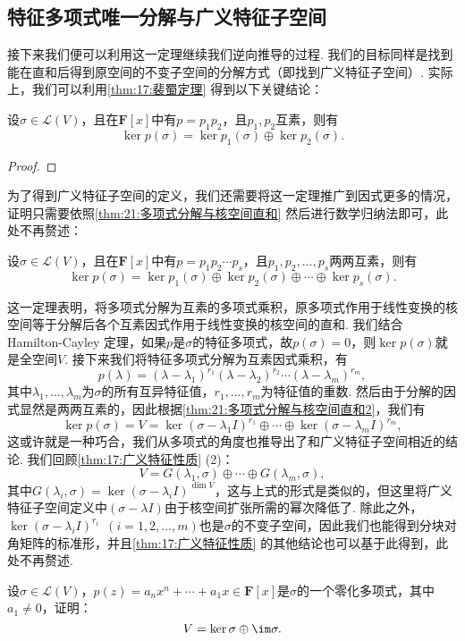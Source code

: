 \subsection{特征多项式唯一分解与广义特征子空间}
接下来我们便可以利用这一定理继续我们逆向推导的过程. 我们的目标同样是找到能在直和后得到原空间的不变子空间的分解方式（即找到广义特征子空间）. 实际上，我们可以利用\autoref{thm:17:裴蜀定理} 得到以下关键结论：
\begin{theorem} \label{thm:21:多项式分解与核空间直和}
    设$\sigma\in \mathcal{L}(V)$，且在$\mathbf{F}[x]$中有$p=p_1p_2$，且$p_1,p_2$互素，则有
    \[\ker p(\sigma)=\ker p_1(\sigma)\oplus\ker p_2(\sigma).\]
\end{theorem}

\begin{proof}

\end{proof}

为了得到广义特征子空间的定义，我们还需要将这一定理推广到因式更多的情况，证明只需要依照\autoref{thm:21:多项式分解与核空间直和} 然后进行数学归纳法即可，此处不再赘述：
\begin{theorem} \label{thm:21:多项式分解与核空间直和2}
    设$\sigma\in \mathcal{L}(V)$，且在$\mathbf{F}[x]$中有$p=p_1p_2\cdots p_s$，且$p_1,p_2,\ldots,p_s$两两互素，则有\[\ker p(\sigma)=\ker p_1(\sigma)\oplus\ker p_2(\sigma)\oplus\cdots\oplus\ker p_s(\sigma).\]
\end{theorem}

这一定理表明，将多项式分解为互素的多项式乘积，原多项式作用于线性变换的核空间等于分解后各个互素因式作用于线性变换的核空间的直和. 我们结合 Hamilton-Cayley 定理，如果$p$是$\sigma$的特征多项式，故$p(\sigma)=0$，则$\ker p(\sigma)$就是全空间$V$. 接下来我们将特征多项式分解为互素因式乘积，有
\[p(\lambda)=(\lambda-\lambda_1)^{r_1}(\lambda-\lambda_2)^{r_2}\cdots(\lambda-\lambda_m)^{r_m},\]
其中$\lambda_1,\ldots,\lambda_m$为$\sigma$的所有互异特征值，$r_1,\ldots,r_m$为特征值的重数. 然后由于分解的因式显然是两两互素的，因此根据\autoref{thm:21:多项式分解与核空间直和2}，我们有
\[\ker p(\sigma)=V=\ker (\sigma-\lambda_1I)^{r_1}\oplus\cdots\oplus\ker (\sigma-\lambda_mI)^{r_m},\]
这或许就是一种巧合，我们从多项式的角度也推导出了和广义特征子空间相近的结论. 我们回顾\autoref{thm:17:广义特征性质} (2)：
\[V=G(\lambda_1,\sigma)\oplus\cdots\oplus G(\lambda_m,\sigma),\]
其中$G(\lambda_i,\sigma)=\ker (\sigma-\lambda_iI)^{\dim V}$，这与上式的形式是类似的，但这里将广义特征子空间定义中$(\sigma-\lambda I)$由于核空间扩张所需的幂次降低了. 除此之外，$\ker (\sigma-\lambda_iI)^{r_i}\enspace(i=1,2,\ldots,m)$也是$\sigma$的不变子空间，因此我们也能得到分块对角矩阵的标准形，并且\autoref{thm:17:广义特征性质} 的其他结论也可以基于此得到，此处不再赘述.
\begin{example}
    设$\sigma\in \mathcal{L}(V)$，$p(z)=a_nx^n+\cdots+a_1x\in\mathbf{F}[x]$是$\sigma$的一个零化多项式，其中$a_1\neq 0$，证明：
    \[V=\ker \sigma\oplus\im\sigma.\]
\end{example}

